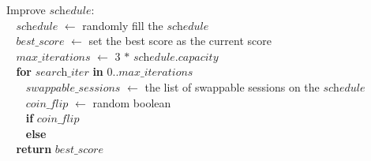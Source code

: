 % 
% 
\begin{tabbing}Improve $\textit{schedule}$$:$\\
$~~~~$$\textit{schedule}$ $\leftarrow$ randomly fill the $\textit{schedule}$\\
$~~~~$$\textit{best\_score}$ $\leftarrow$ set the best score as the current score\\
$~~~~$$\textit{max\_iterations}$ $\leftarrow$ $3$ $*$ $\textit{schedule}$$.$$\textit{capacity}$\\
$~~~~${\bf for} $\textit{search\_iter}$ {\bf in} $0..$$\textit{max\_iterations}$\\
$~~~~~~~~$$\textit{swappable\_sessions}$ $\leftarrow$ the list of swappable sessions on the $\textit{schedule}$\\
$~~~~~~~~$$\textit{coin\_flip}$ $\leftarrow$ random boolean\\
$~~~~~~~~${\bf if} $\textit{coin\_flip}$\\

$~~~~~~~~${\bf else}\\

$~~~~${\bf return} $\textit{best\_score}$\\
\end{tabbing}